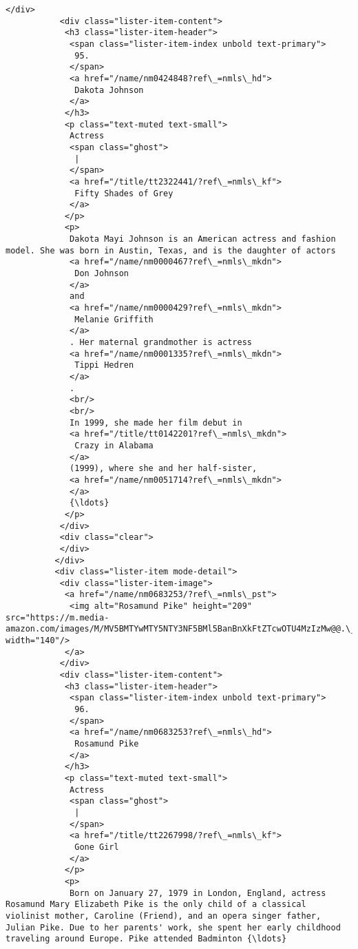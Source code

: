 \documentclass[11pt]{article}
\begin{document}
\begin{Verbatim}[commandchars=\\\{\}]
           </div>
           <div class="lister-item-content">
            <h3 class="lister-item-header">
             <span class="lister-item-index unbold text-primary">
              95.
             </span>
             <a href="/name/nm0424848?ref\_=nmls\_hd">
              Dakota Johnson
             </a>
            </h3>
            <p class="text-muted text-small">
             Actress
             <span class="ghost">
              |
             </span>
             <a href="/title/tt2322441/?ref\_=nmls\_kf">
              Fifty Shades of Grey
             </a>
            </p>
            <p>
             Dakota Mayi Johnson is an American actress and fashion model. She was born in Austin, Texas, and is the daughter of actors
             <a href="/name/nm0000467?ref\_=nmls\_mkdn">
              Don Johnson
             </a>
             and
             <a href="/name/nm0000429?ref\_=nmls\_mkdn">
              Melanie Griffith
             </a>
             . Her maternal grandmother is actress
             <a href="/name/nm0001335?ref\_=nmls\_mkdn">
              Tippi Hedren
             </a>
             .
             <br/>
             <br/>
             In 1999, she made her film debut in
             <a href="/title/tt0142201?ref\_=nmls\_mkdn">
              Crazy in Alabama
             </a>
             (1999), where she and her half-sister,
             <a href="/name/nm0051714?ref\_=nmls\_mkdn">
             </a>
             {\ldots}
            </p>
           </div>
           <div class="clear">
           </div>
          </div>
          <div class="lister-item mode-detail">
           <div class="lister-item-image">
            <a href="/name/nm0683253/?ref\_=nmls\_pst">
             <img alt="Rosamund Pike" height="209" src="https://m.media-amazon.com/images/M/MV5BMTYwMTY5NTY3NF5BMl5BanBnXkFtZTcwOTU4MzIzMw@@.\_V1\_UY209\_CR87,0,140,209\_AL\_.jpg" width="140"/>
            </a>
           </div>
           <div class="lister-item-content">
            <h3 class="lister-item-header">
             <span class="lister-item-index unbold text-primary">
              96.
             </span>
             <a href="/name/nm0683253?ref\_=nmls\_hd">
              Rosamund Pike
             </a>
            </h3>
            <p class="text-muted text-small">
             Actress
             <span class="ghost">
              |
             </span>
             <a href="/title/tt2267998/?ref\_=nmls\_kf">
              Gone Girl
             </a>
            </p>
            <p>
             Born on January 27, 1979 in London, England, actress Rosamund Mary Elizabeth Pike is the only child of a classical violinist mother, Caroline (Friend), and an opera singer father, Julian Pike. Due to her parents' work, she spent her early childhood traveling around Europe. Pike attended Badminton {\ldots}

\end{Verbatim}
\end{document}
